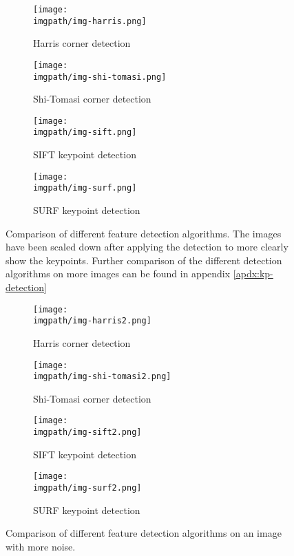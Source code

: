 \begin{figure}[H]
	\begin{subfigure}{0.45\textwidth}
	\texttt{[image: \\imgpath/img-harris.png]}
	\caption{Harris corner detection}
	\end{subfigure}
	\hspace*{\fill}
	\begin{subfigure}{0.45\textwidth}
	\texttt{[image: \\imgpath/img-shi-tomasi.png]}
	\caption{Shi-Tomasi corner detection}
	\end{subfigure}
	
	\vspace{0.5cm}
	
	\begin{subfigure}{0.45\textwidth}
	\texttt{[image: \\imgpath/img-sift.png]}
	\caption{SIFT keypoint detection}
	\end{subfigure}
	\hspace*{\fill}
	\begin{subfigure}{0.45\textwidth}
	\texttt{[image: \\imgpath/img-surf.png]}
	\caption{SURF keypoint detection}
	\end{subfigure}
	
\caption{Comparison of different feature detection algorithms. The images have been scaled down after applying the detection to more clearly show the keypoints. Further comparison of the different detection algorithms on more images can be found in appendix \ref{apdx:kp-detection}}
\label{fig:kp-comparison}
\end{figure}
\begin{figure}[H]
	\begin{subfigure}{0.45\textwidth}
	\texttt{[image: \\imgpath/img-harris2.png]}
	\caption{Harris corner detection}
	\end{subfigure}
	\hspace*{\fill}
	\begin{subfigure}{0.45\textwidth}
	\texttt{[image: \\imgpath/img-shi-tomasi2.png]}
	\caption{Shi-Tomasi corner detection}
	\end{subfigure}
	
	\vspace{0.5cm}
	
	\begin{subfigure}{0.45\textwidth}
	\texttt{[image: \\imgpath/img-sift2.png]}
	\caption{SIFT keypoint detection}
	\end{subfigure}
	\hspace*{\fill}
	\begin{subfigure}{0.45\textwidth}
	\texttt{[image: \\imgpath/img-surf2.png]}
	\caption{SURF keypoint detection}
	\end{subfigure}
	
\caption{Comparison of different feature detection algorithms on an image with more noise.}
\label{fig:kp-comparison-noise}
\end{figure}
